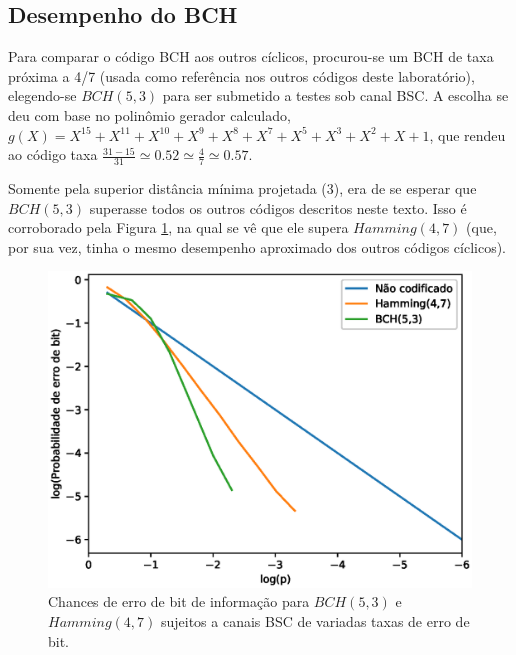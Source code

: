 \subsection{\label{desempenho_bch}Desempenho do BCH}

Para comparar o código BCH aos outros cíclicos, procurou-se um BCH de taxa próxima a 4/7 (usada como referência nos outros códigos deste laboratório), elegendo-se $BCH(5, 3)$ para ser submetido a testes sob canal BSC. A escolha se deu com base no polinômio gerador calculado, $g(X)=X^{15}+X^{11}+X^{10}+X^9+X^8+X^7+X^5+X^3+X^2+X+1$, que rendeu ao código taxa $\frac{31-15}{31}\simeq 0.52\simeq \frac{4}{7}\simeq 0.57$.

Somente pela superior distância mínima projetada (3), era de se esperar que $BCH(5,3)$ superasse todos os outros códigos descritos neste texto. Isso é corroborado pela Figura \ref{fig:bch_performance}, na qual se vê que ele supera $Hamming(4,7)$ (que, por sua vez, tinha o mesmo desempenho aproximado dos outros códigos cíclicos).

\begin{figure}[!hb]
	\centering
    \captionsetup{justification=centering}
	\includegraphics[scale=0.6]{floats/bch-performance.eps}
	\caption{\label{fig:bch_performance}Chances de erro de bit de informação para $BCH(5,3)$ e $Hamming(4,7)$ sujeitos a canais BSC de variadas taxas de erro de bit.}
\end{figure}